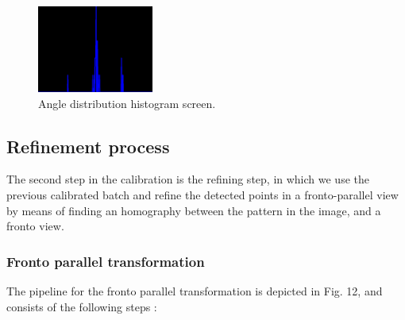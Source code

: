 \documentclass[journal]{IEEEtran}
\begin{document}
\begin{figure}[H]
\centering
\includegraphics[width=1.5in]{_img/img_report3_angle_histogram.png}
\caption{Angle distribution histogram screen.}
\end{figure}

\subsection{ \textbf{ Refinement process } }

The second step in the calibration is the refining step, in which we use the previous calibrated batch and refine the detected points in a fronto-parallel view by means of finding an homography between the pattern in the image, and a fronto view.

\subsubsection{ \textbf{ Fronto parallel transformation } }

The pipeline for the fronto parallel transformation is depicted in Fig. 12, and consists of the following steps :
\end{document}
